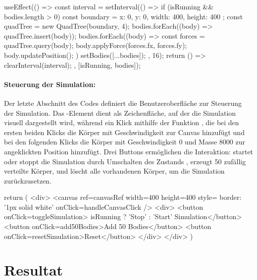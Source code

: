 \documentclass[a4paper,12pt,twoside]{article}
\begin{document}
\begin{javascript}
useEffect(() => {
    const interval = setInterval(() => {
        if (isRunning && bodies.length > 0) {
            const boundary = { x: 0, y: 0, width: 400, height: 400 };
            const quadTree = new QuadTree(boundary, 4);
            bodies.forEach((body) => quadTree.insert(body));
            bodies.forEach((body) => {
                const forces = quadTree.query(body);
                body.applyForce(forces.fx, forces.fy);
                body.updatePosition();
            })
            setBodies([...bodies]);
        }
    }, 16);
    return () => clearInterval(interval);
}, [isRunning, bodies]);
\end{javascript}


\paragraph{Steuerung der Simulation:}
Der letzte Abschnitt des Codes definiert die Benutzeroberfläche zur Steuerung der 
Simulation. Das -Element dient als Zeichenfläche, auf der die Simulation visuell dargestellt wird, 
während ein Klick mithilfe der Funktion , 
die bei den ersten beiden Klicks die Körper mit Geschwindigkeit zur 
Canvas hinzufügt und bei den folgenden Klicks die Körper mit Geschwindigkeit 0 
und Masse 8000 zur angeklickten Position hinzufügt.
Drei Buttons ermöglichen die Interaktion: 
startet oder stoppt die Simulation durch Umschalten des Zustands 
,  erzeugt 50 zufällig 
verteilte Körper, 
und  löscht alle vorhandenen Körper, 
um die Simulation zurückzusetzen.


\begin{javascript}
    return (
        <div>
            <canvas ref={canvasRef} width={400} height={400} style={{ border: '1px solid white' }} onClick={handleCanvasClick} />
            <div>
                <button onClick={toggleSimulation}> {isRunning ? 'Stop' : 'Start'} Simulation</button>
                <button onClick={add50Bodies}>Add 50 Bodies</button>
                <button onClick={resetSimulation}>Reset</button>
            </div>
        </div>
    )
\end{javascript}


\section{Resultat}
\end{document}
